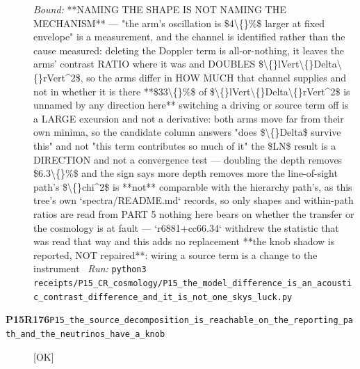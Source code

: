 \begin{description}
 \emph{Bound:}  **NAMING THE SHAPE IS NOT NAMING THE MECHANISM** --- "the arm's oscillation is \$4\textbackslash\{\}\%\$ larger at fixed envelope" is a measurement, and the channel is identified rather than the cause measured: deleting the Doppler term is all-or-nothing, it leaves the arms' contrast RATIO where it was and DOUBLES \$\textbackslash\{\}lVert\textbackslash\{\}Delta\textbackslash\{\}rVert\textasciicircum{}2\$, so the arms differ in HOW MUCH that channel supplies and not in whether it is there  **\$33\textbackslash\{\}\%\$ of \$\textbackslash\{\}lVert\textbackslash\{\}Delta\textbackslash\{\}rVert\textasciicircum{}2\$ is unnamed by any direction here**  switching a driving or source term off is a LARGE excursion and not a derivative: both arms move far from their own minima, so the candidate column answers "does \$\textbackslash\{\}Delta\$ survive this" and not "this term contributes so much of it"  the \$LN\$ result is a DIRECTION and not a convergence test --- doubling the depth removes \$6.3\textbackslash\{\}\%\$ and the sign says more depth removes more  the line-of-sight path's \$\textbackslash\{\}chi\textasciicircum{}2\$ is **not** comparable with the hierarchy path's, as this tree's own `spectra/README.md` records, so only shapes and within-path ratios are read from PART 5  nothing here bears on whether the transfer or the cosmology is at fault --- `r6881+cc66.34` withdrew the statistic that was read that way and this adds no replacement  **the knob shadow is reported, NOT repaired**: wiring a source term is a change to the instrument
\ \emph{Run:} \texttt{python3 receipts/P15\_CR\_cosmology/P15\_the\_model\_difference\_is\_an\_acoustic\_contrast\_difference\_and\_it\_is\_not\_one\_skys\_luck.py}
\item[\rcptlabel{P15_the_source_decomposition_is_reachable_on_the_reporting_path_and_the_neutrinos_have_a_knob}{P15R176}\textbf{P15R176}\quad\texttt{P15\_the\_source\_decomposition\_is\_reachable\_on\_the\_reporting\_path\_and\_the\_neutrinos\_have\_a\_knob}]\hfill\textsf{[OK]}\\

\end{description}
